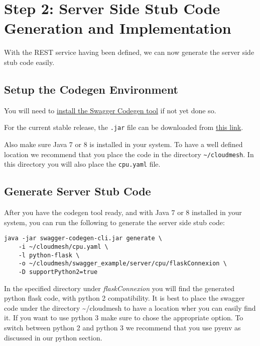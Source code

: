 \section{Step 2: Server Side Stub Code Generation and
Implementation}\label{step-2-server-side-stub-code-generation-and-implementation}

With the REST service having been defined, we can now generate the
server side stub code easily.

\subsection{Setup the Codegen
Environment}\label{setup-the-codegen-environment}

You will need to \href{https://swagger.io/docs/swagger-tools/}{install
the Swagger Codegen tool} if not yet done so.

For the current stable release, the \texttt{.jar} file can be downloaded
from
\href{https://oss.sonatype.org/content/repositories/releases/io/swagger/swagger-codegen-cli/2.2.1/swagger-codegen-cli-2.2.1.jar}{this
link}.

Also make sure Java 7 or 8 is installed in your system. To have a well
defined location we recommend that you place the code in the directory
\texttt{\textasciitilde{}/cloudmesh}. In this directory you will also
place the \texttt{cpu.yaml} file.

\subsection{Generate Server Stub
Code}\label{generate-server-stub-code}

After you have the codegen tool ready, and with Java 7 or 8 installed in
your system, you can run the following to generate the server side stub
code:

\begin{lstlisting}
java -jar swagger-codegen-cli.jar generate \
    -i ~/cloudmesh/cpu.yaml \
    -l python-flask \
    -o ~/cloudmesh/swagger_example/server/cpu/flaskConnexion \
    -D supportPython2=true
\end{lstlisting}

In the specified directory under \emph{flaskConnexion} you will find the
generated python flask code, with python 2 compatibility. It is best to
place the swagger code under the directory \textasciitilde{}/cloudmesh
to have a location wher you can easily find it. If you want to use
python 3 make sure to chose the appropriate option. To switch between
python 2 and python 3 we recommend that you use pyenv as discussed in
our python section.

